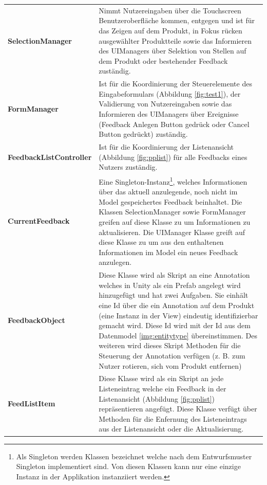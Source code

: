 \vspace{4mm}
\begin{tabularx}{\textwidth}{l X}
	\vspace{1mm}\textbf{SelectionManager} & Nimmt Nutzereingaben über die Touchscreen Benutzeroberfläche kommen, entgegen und ist für das Zeigen auf dem Produkt, in Fokus rücken ausgewählter Produktteile sowie das Informieren des UIManagers über Selektion von Stellen auf dem Produkt oder bestehender Feedback zuständig.\\
	\vspace{1mm}\textbf{FormManager} & Ist für die Koordinierung der Steuerelemente des Eingabeformulars (Abbildung \ref{fig:test1}), der Validierung von Nutzereingaben sowie das Informieren des UIManagers über Ereignisse (Feedback Anlegen Button gedrück oder Cancel Button gedrückt) zuständig. \\
	\vspace{1mm}\textbf{FeedbackListController}  & Ist für die Koordinierung der Listenansicht (Abbildung \ref{fig:pplist}) für alle Feedbacks eines Nutzers zuständig.\\
	\vspace{1mm}\textbf{CurrentFeedback}  & Eine Singleton-Instanz\footnote{Als Singleton werden Klassen bezeichnet welche nach dem Entwurfsmuster Singleton implementiert sind. Von diesen Klassen kann nur eine einzige Instanz in der Applikation instanziiert werden.}, welches Informationen über das aktuell anzulegende, noch nicht im Model gespeichertes Feedback beinhaltet. Die Klassen SelectionManager sowie FormManager greifen auf diese Klasse zu um Informationen zu aktualisieren. Die UIManager Klasse greift auf diese Klasse zu um aus den enthaltenen Informationen im Model ein neues Feedback anzulegen.\\
	\vspace{1mm}\textbf{FeedbackObject}  & Diese Klasse wird als Skript an eine Annotation welches in Unity als ein Prefab angelegt wird hinzugefügt und hat zwei Aufgaben. Sie einhält eine Id über die ein Annotation auf dem Produkt (eine Instanz in der View) eindeutig identifizierbar gemacht wird. Diese Id wird mit der Id aus dem Datenmodel \ref{img:entitytype} übereinstimmen. Des weiteren wird dieses Skript Methoden für die Steuerung der Annotation verfügen (z. B. zum Nutzer rotieren, sich vom Produkt entfernen)\\
	\vspace{1mm}\textbf{FeedListItem} & Diese Klasse wird als ein Skript an jede Listeneintrag welche ein Feedback in der Listenansicht (Abbildung \ref{fig:pplist}) repräsentieren angefügt. Diese Klasse verfügt über Methoden für die Enfernung des Listeneintrags aus der Listenansicht oder die Aktualisierung. \\

\end{tabularx}
